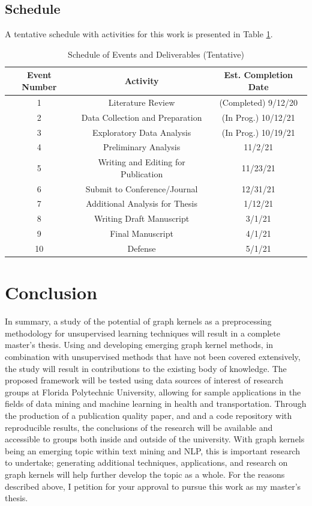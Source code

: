 \documentclass[11pt]{report}
\begin{document}
\subsection{Schedule}
 
A tentative schedule with activities for this work is presented in Table \ref{tab:schedule}.


\begin{table}[ht]
\caption{Schedule of Events and Deliverables (Tentative)}
\label{tab:schedule}
\centering
\begin{tabular}{ c c c}
\hline
\hline
Event Number & Activity & Est. Completion Date \\ [0.5ex]
\hline
1 & Literature Review & (Completed) 9/12/20\\
2 & Data Collection and Preparation & (In Prog.)  10/12/21\\
3 & Exploratory Data Analysis & (In Prog.) 10/19/21\\
4 & Preliminary Analysis & 11/2/21\\
5 & Writing and Editing for Publication & 11/23/21\\
6 & Submit to Conference/Journal & 12/31/21\\
7 & Additional Analysis for Thesis & 1/12/21\\
8 & Writing Draft Manuscript & 3/1/21\\
9 & Final Manuscript & 4/1/21\\
10 & Defense & 5/1/21\\
\hline
\end{tabular}

\end{table}




\section{Conclusion}


In summary, a study of the potential of graph kernels as a preprocessing methodology for unsupervised learning techniques will result in a complete master's thesis. Using and developing emerging graph kernel methods, in combination with unsupervised methods that have not been covered extensively, the study will result in contributions to the existing body of knowledge. The proposed framework will be tested using data sources of interest of research groups at Florida Polytechnic University, allowing for sample applications in the fields of data mining and machine learning in health and transportation. Through the production of a publication quality paper, and and a code repository with reproducible results, the conclusions of the research will be available and accessible to groups both inside and outside of the university. With graph kernels being an emerging topic within text mining and NLP, this is important research to undertake; generating additional techniques, applications, and research on graph kernels will help further develop the topic as a whole.  
For the reasons described above, I petition for your approval to pursue this work as my master's thesis.
\end{document}
